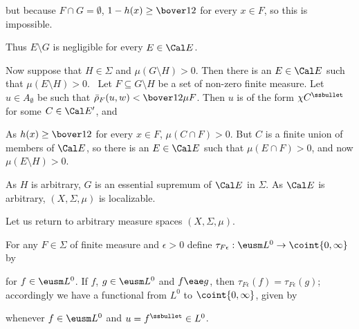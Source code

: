 {

\noindent but because $F\cap G=\emptyset$, $1-h(x)\ge\bover12$ for every
$x\in F$, so this is impossible.\ \Bang

Thus $E\setminus G$ is negligible for every $E\in\Cal E$.

Now suppose that $H\in\Sigma$ and $\mu(G\setminus H)>0$.   Then there is
an $E\in\Cal E$ such that $\mu(E\setminus H)>0$.   \Prf\ Let
$F\subseteq G\setminus H$ be a set of non-zero finite measure.   Let
$u\in A_{\emptyset}$ be such that $\bar\rho_F(u,w)<\bover12\mu F$.
Then $u$ is of the form $\chi C^{\ssbullet}$ for some $C\in\Cal E'$, and


\noindent As $h(x)\ge\bover12$ for every $x\in F$, $\mu(C\cap F)>0$.
But $C$ is a finite union of members of $\Cal E$, so there is an
$E\in\Cal E$ such that $\mu(E\cap F)>0$, and now $\mu(E\setminus
H)>0$.\ \Qed

As $H$ is arbitrary, $G$ is an essential supremum of $\Cal E$ in
$\Sigma$.   As $\Cal E$ is arbitrary, $(X,\Sigma,\mu)$ is localizable.
}%

 Let us return to arbitrary measure spaces $(X,\Sigma,\mu)$.

 For any $F\in\Sigma$ of finite measure and
$\epsilon>0$ define $\tau_{F\epsilon}:\eusm L^0\to\coint{0,\infty}$ by


\noindent for $f\in\eusm L^0$.   If $f$, $g\in\eusm L^0$ and
$f\eae g$, then $\tau_{F\epsilon}(f)=\tau_{F\epsilon}(g)$;
accordingly we have a functional from $L^0$ to $\coint{0,\infty}$, given
by


\noindent whenever $f\in\eusm L^0$ and $u=f^{\ssbullet}\in L^0$.

